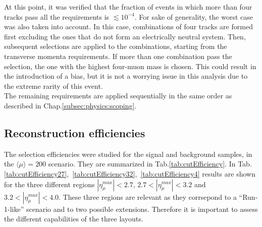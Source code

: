 \documentclass[a4paper,twoside,12pt]{book}
\begin{document}
At this point, it was verified that the fraction of events in which more than four tracks
pass all the requirements is $\lesssim 10^{-4}$. For sake of generality, the worst 
case was also taken into account. In this case, combinations of four tracks are formed
first excluding the ones that do not form an electrically neutral system. Then, subsequent
selections are applied to the combinations, starting from the transverse momenta requirements. If more
than one combination pass the selection, the one with the highest four-muon mass is chosen. 
This could result in the introduction of a bias, but it is not a worrying issue in this analysis due to
the extreme rarity of this event.\\

The remaining requirements are applied sequentially in the same order as described in Chap.\ref{subsec:physics:scoping}.

\subsection{Reconstruction efficiencies}\label{subsec:recoEfficiency}

The selection efficiencies were studied for the signal and background samples, in the $\langle\mu\rangle = 200$ scenario. They are summarized in 
Tab.\ref{tab:cutEfficiency}. In \mbox{Tab.\ref{tab:cutEfficiency27}, \ref{tab:cutEfficiency32}, \ref{tab:cutEfficiency4}} results are shown for the three different regions $|\eta_{\mu}^{max}| < 2.7$, 
$2.7 < |\eta_{\mu}^{max}| < 3.2$ and $3.2 < |\eta_{\mu}^{max}| < 4.0$. These three regions are relevant as they corrsepond to a ``Run-1-like'' scenario and to two possible extensions. Therefore
it is important to assess the different capabilities of the three layouts.\\
\end{document}
